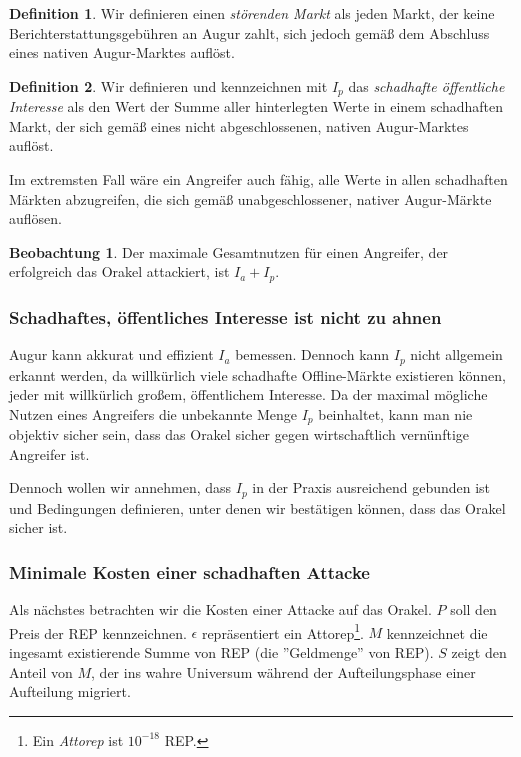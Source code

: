 \documentclass[floatfix,reprint,nofootinbib,amsmath,amssymb,epsfig,pre,floats,letterpaper,groupedaffiliation]{revtex4-1}
\theoremstyle{definition}
\newtheorem{observation}{Beobachtung}
\theoremstyle{definition}
\newtheorem{definition}{Definition}
\theoremstyle{definition}
\begin{document}
\begin{definition}
Wir definieren einen \textit{störenden Markt} als jeden Markt, der keine Berichterstattungsgebühren an Augur zahlt, sich jedoch gemäß dem Abschluss eines nativen Augur-Marktes auflöst.
\end{definition}

\begin{definition}
Wir definieren und kennzeichnen mit $I_p$ das \textit{schadhafte öffentliche Interesse} als den Wert der Summe aller hinterlegten Werte in einem schadhaften Markt, der sich gemäß eines nicht abgeschlossenen, nativen Augur-Marktes auflöst.
\end{definition}

Im extremsten Fall wäre ein Angreifer auch fähig, alle Werte in allen schadhaften Märkten abzugreifen, die sich gemäß unabgeschlossener, nativer Augur-Märkte auflösen.

\begin{observation}
Der maximale Gesamtnutzen für einen Angreifer, der erfolgreich das Orakel attackiert, ist $I_a + I_p$.
\end{observation}

\subsubsection{Schadhaftes, öffentliches Interesse ist nicht zu ahnen}

Augur kann akkurat und effizient $I_a$ bemessen. Dennoch kann $I_p$ nicht allgemein erkannt werden, da willkürlich viele schadhafte Offline-Märkte existieren können, jeder mit willkürlich großem, öffentlichem Interesse. Da der maximal mögliche Nutzen eines Angreifers die unbekannte Menge $I_p$ beinhaltet, kann man nie objektiv sicher sein, dass das Orakel sicher gegen wirtschaftlich vernünftige Angreifer ist.

Dennoch wollen wir annehmen, dass $I_p$ in der Praxis ausreichend gebunden ist und Bedingungen definieren, unter denen wir bestätigen können, dass das Orakel sicher ist.

\subsubsection{Minimale Kosten einer schadhaften Attacke}

Als nächstes betrachten wir die Kosten einer Attacke auf das Orakel. $P$ soll den Preis der REP kennzeichnen. $\epsilon$ repräsentiert ein Attorep\footnote{Ein \textit{Attorep} ist $10^{-18}$ REP.}. $M$ kennzeichnet die ingesamt existierende Summe von REP (die ''Geldmenge'' von REP). $S$ zeigt den Anteil von $M$, der ins wahre Universum während der Aufteilungsphase einer Aufteilung migriert.
\end{document}
